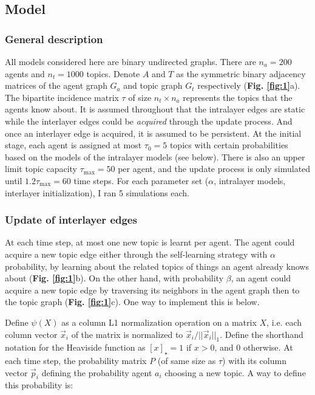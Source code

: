 \documentclass{svproc}
\begin{document}
\subsection{Model} \label{sec:method-model}



\subsubsection*{General description}

All models considered here are binary undirected graphs. There are $n_a = 200$ agents and $n_t = 1000$ topics. Denote $A$ and $T$ as the symmetric binary adjacency matrices of the agent graph $G_a$ and topic graph $G_t$ respectively (\textbf{Fig. \ref{fig:1}}a). The bipartite incidence matrix $\tau$ of size $n_t \times n_a$ represents the topics that the agents know about. It is assumed throughout that the intralayer edges are static while the interlayer edges could be \textit{acquired} through the update process. And once an interlayer edge is acquired, it is assumed to be persistent. At the initial stage, each agent is assigned at most $\tau_0 = 5$ topics with certain probabilities based on the models of the intralayer models (see below). There is also an upper limit topic capacity $\tau_{\mathrm{max}} = 50$ per agent, and the update process is only simulated until $1.2 \tau_{\mathrm{max}} = 60$ time steps. For each parameter set ($\alpha$, intralayer models, interlayer initialization), I ran 5 simulations each.

\vspace{-1em}
\subsubsection*{Update of interlayer edges}

At each time step, at most one new topic is learnt per agent. The agent could acquire a new topic edge either through the self-learning strategy with $\alpha$ probability, by learning about the related topics of things an agent already knows about (\textbf{Fig. \ref{fig:1}}b). On the other hand, with probability $\beta$, an agent could acquire a new topic edge by traversing its neighbors in the agent graph then to the topic graph (\textbf{Fig. \ref{fig:1}}c). One way to implement this is below.

Define $\psi(X)$ as a column L1 normalization operation on a matrix $X$, i.e. each column vector $\vec{x}_i$ of the matrix is normalized to $\vec{x}_i/||\vec{x}_i||_1$. Define the shorthand notation for the Heaviside function as $[x]_{\star} = 1$ if $x > 0$, and $0$ otherwise. At each time step, the probability matrix $P$ (of same size as $\tau$) with its column vector $\vec{p}_i$ defining the probability agent $a_i$ choosing a new topic. A way to define this probability is:
\end{document}
